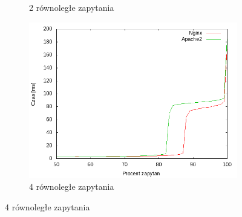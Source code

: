 \begin{figure}
\begin{subfigure}[h]{0.3\textwidth}
		\caption{2 równoległe zapytania}
	\end{subfigure}
	\begin{subfigure}[h]{0.3\textwidth}
		\includegraphics[width=\textwidth]{testy/wybor_fib_5_4.png}
		\caption{4 równoległe zapytania}
	\end{subfigure}


\end{figure}
